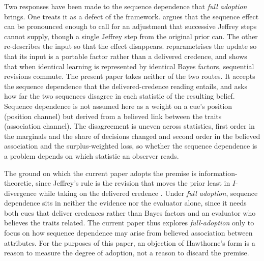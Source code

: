 \documentclass[a4paper,fleqn]{cas-sc}
\theoremstyle{remark}
\theoremstyle{definition}
\begin{document}
Two responses have been made to the sequence dependence that \emph{full adoption} brings. One treats it as a defect of the framework. \citet{Doring1999} argues that the sequence effect can
be pronounced enough to call for an adjustment that successive Jeffrey steps cannot supply, though a single Jeffrey step from the original prior can. The other
re-describes the input so that the effect disappears. \citet{Field1978} reparametrises the update so that its input is a portable factor rather than a
delivered credence, and \citet{Wagner2002} shows that when identical learning is represented by identical Bayes factors, sequential revisions commute. The present paper takes neither of the two routes. It accepts the sequence dependence that the delivered-credence reading entails, and asks how far the two
sequences disagree in each statistic of the resulting belief. Sequence dependence is not assumed here as a weight on a cue's position (position
channel) but derived from a believed link between the traits (association channel). The disagreement is uneven across statistics, first order in the marginals and the
share of decisions changed and second order in the believed association and the
surplus-weighted loss, so whether the sequence dependence is a problem depends on
which statistic an observer reads.

\par

The ground on which the current paper adopts the premise is information-theoretic, since Jeffrey's rule is the revision that moves the prior least in $I$-divergence while taking on the delivered credence \citep{DiaconisZabell1982}. Under \emph{full adoption}, sequence dependence sits in neither the evidence nor the
evaluator alone, since it needs both cues that deliver credences rather than Bayes
factors and an evaluator who believes the traits related. The current paper thus explores \emph{full-adoption} only to focus on how sequence dependence may arise from believed association between attributes. For the purposes of this paper, an objection of Hawthorne's form is a reason to measure the degree of adoption, not a reason to discard the premise. 
\end{document}
